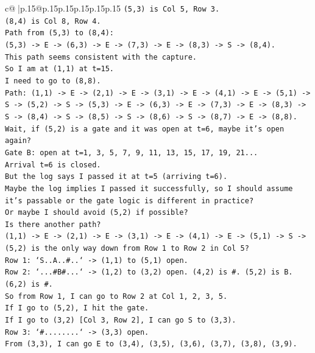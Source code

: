\documentclass{article}
\begin{document}
{\begin{supertabular}{c@{$\;$}|p{.15\linewidth}@{}p{.15\linewidth}p{.15\linewidth}p{.15\linewidth}p{.15\linewidth}p{.15\linewidth}}
{{{\texttt{(5,3) is Col 5, Row 3.} \\
\texttt{(8,4) is Col 8, Row 4.} \\
\texttt{Path from (5,3) to (8,4):} \\
\texttt{(5,3) {-}> E {-}> (6,3) {-}> E {-}> (7,3) {-}> E {-}> (8,3) {-}> S {-}> (8,4).} \\
\texttt{This path seems consistent with the capture.} \\
\texttt{So I am at (1,1) at t=15.} \\
\texttt{I need to go to (8,8).} \\
\texttt{Path: (1,1) {-}> E {-}> (2,1) {-}> E {-}> (3,1) {-}> E {-}> (4,1) {-}> E {-}> (5,1) {-}> S {-}> (5,2) {-}> S {-}> (5,3) {-}> E {-}> (6,3) {-}> E {-}> (7,3) {-}> E {-}> (8,3) {-}> S {-}> (8,4) {-}> S {-}> (8,5) {-}> S {-}> (8,6) {-}> S {-}> (8,7) {-}> E {-}> (8,8).} \\
\texttt{Wait, if (5,2) is a gate and it was open at t=6, maybe it's open again?} \\
\texttt{Gate B: open at t=1, 3, 5, 7, 9, 11, 13, 15, 17, 19, 21...} \\
\texttt{Arrival t=6 is closed.} \\
\texttt{But the log says I passed it at t=5 (arriving t=6).} \\
\texttt{Maybe the log implies I passed it successfully, so I should assume it's passable or the gate logic is different in practice?} \\
\texttt{Or maybe I should avoid (5,2) if possible?} \\
\texttt{Is there another path?} \\
\texttt{(1,1) {-}> E {-}> (2,1) {-}> E {-}> (3,1) {-}> E {-}> (4,1) {-}> E {-}> (5,1) {-}> S {-}> (5,2) is the only way down from Row 1 to Row 2 in Col 5?} \\
\texttt{Row 1: `S..A..\#..` {-}> (1,1) to (5,1) open.} \\
\texttt{Row 2: `...\#B\#...` {-}> (1,2) to (3,2) open. (4,2) is \#. (5,2) is B. (6,2) is \#.} \\
\texttt{So from Row 1, I can go to Row 2 at Col 1, 2, 3, 5.} \\
\texttt{If I go to (5,2), I hit the gate.} \\
\texttt{If I go to (3,2) {[}Col 3, Row 2{]}, I can go S to (3,3).} \\
\texttt{Row 3: `\#........` {-}> (3,3) open.} \\
\texttt{From (3,3), I can go E to (3,4), (3,5), (3,6), (3,7), (3,8), (3,9).} \\
}}}
\end{supertabular}}
\end{document}
